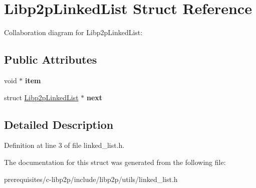 \hypertarget{struct_libp2p_linked_list}{}\section{Libp2p\+Linked\+List Struct Reference}
\label{struct_libp2p_linked_list}


Collaboration diagram for Libp2p\+Linked\+List\+:
\subsection*{Public Attributes}
\begin{DoxyCompactItemize}
\item 
\mbox{\label{struct_libp2p_linked_list_aa6e097a0785621e497aabc33c99740ea}} 
void $\ast$ {\bfseries item}
\item 
\mbox{\label{struct_libp2p_linked_list_a821baeba274fa74bb81a1880134a966b}} 
struct \mbox{\hyperlink{struct_libp2p_linked_list}{Libp2p\+Linked\+List}} $\ast$ {\bfseries next}
\end{DoxyCompactItemize}


\subsection{Detailed Description}


Definition at line 3 of file linked\+\_\+list.\+h.



The documentation for this struct was generated from the following file\+:\begin{DoxyCompactItemize}
\item 
prerequisites/c-\/libp2p/include/libp2p/utils/linked\+\_\+list.\+h\end{DoxyCompactItemize}
